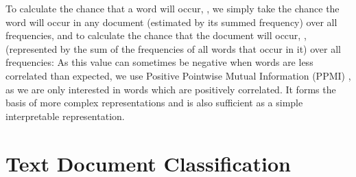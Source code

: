 To calculate the chance that a word will occur, , we simply take the chance the word will occur in any document (estimated by its summed frequency) over all frequencies, and to calculate the chance that the document  will occur, , (represented by the sum of the  frequencies of all words that occur in it) over all frequencies:
As this value can sometimes be negative when words are less correlated than expected, we use Positive Pointwise Mutual Information  (PPMI) \cite{Klabunde2002}, as we are only interested in words which are positively correlated.
 It forms the basis of more complex representations and is also sufficient as a simple interpretable representation. 

\section{Text Document Classification}\label{ch2:classifiers}



